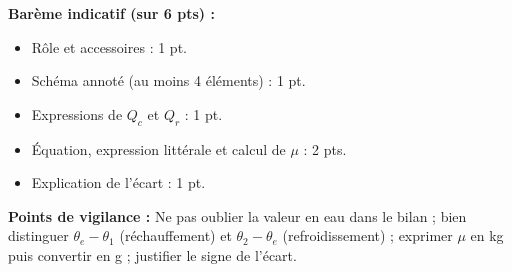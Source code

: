 \documentclass[11pt]{article}
\begin{document}
\begin{corrige}
\begin{enumerate}
\end{enumerate}
\textbf{Barème indicatif (sur 6 pts) :}
\begin{itemize}
\item Rôle et accessoires : 1 pt.
\item Schéma annoté (au moins 4 éléments) : 1 pt.
\item Expressions de $Q_c$ et $Q_r$ : 1 pt.
\item Équation, expression littérale et calcul de $\mu$ : 2 pts.
\item Explication de l'écart : 1 pt.
\end{itemize}
\textbf{Points de vigilance :} Ne pas oublier la valeur en eau dans le bilan ; bien distinguer $\theta_e - \theta_1$ (réchauffement) et $\theta_2 - \theta_e$ (refroidissement) ; exprimer $\mu$ en kg puis convertir en g ; justifier le signe de l'écart.
\end{corrige}
\end{document}
